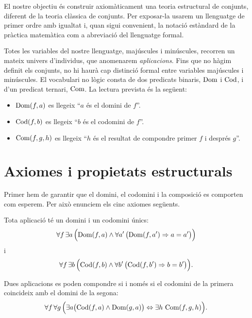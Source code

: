 El nostre objectiu és construir axiomàticament una teoria estructural de conjunts, diferent de la teoria clàssica de conjunts. Per exposar-la usarem un llenguatge de primer ordre amb igualtat i, quan sigui convenient, la notació estàndard de la pràctica matemàtica com a abreviació del llenguatge formal.

Totes les variables del nostre llenguatge, majúscules i minúscules, recorren un mateix univers d'individus, que anomenarem \emph{aplicacions}. Fins que no hàgim definit els conjunts, no hi haurà cap distinció formal entre variables majúscules i minúscules. El vocabulari no lògic consta de dos predicats binaris, \(\operatorname{Dom}\) i \(\operatorname{Cod}\), i d'un predicat ternari, \(\operatorname{Com}\). La lectura prevista és la següent:
\begin{itemize}
  \item \(\operatorname{Dom}(f,a)\) es llegeix \enquote{\(a\) és el domini de \(f\)}.
  \item \(\operatorname{Cod}(f,b)\) es llegeix \enquote{\(b\) és el codomini de \(f\)}.
  \item \(\operatorname{Com}(f,g,h)\) es llegeix \enquote{\(h\) és el resultat de compondre primer \(f\) i després \(g\)}.
\end{itemize}

\section{Axiomes i propietats estructurals}\label{sec:axiomes-estructurals}

Primer hem de garantir que el domini, el codomini i la composició es comporten com esperem. Per això enunciem els cinc axiomes següents. 

\begin{axioma}\label{ax:dom-cod}
Tota aplicació té un domini i un codomini únics:
\[
\forall f\,\exists a\,\Bigl(\operatorname{Dom}(f,a)\land
  \forall a' \,\bigl(\operatorname{Dom}(f,a')\Rightarrow a=a'\bigr)\Bigr)
\]
i
\[
\forall f\,\exists b\,\Bigl(\operatorname{Cod}(f,b)\land
  \forall b'\,\bigl(\operatorname{Cod}(f,b')\Rightarrow b=b'\bigr)\Bigr).
\]
\end{axioma}

\begin{axioma}\label{ax:composicio-existencia}
Dues aplicacions es poden compondre si i només si el codomini de la primera coincideix amb el domini de la segona:
\[
\forall f\,\forall g\,
\Bigl(
  \exists a\bigl(\operatorname{Cod}(f,a)\land\operatorname{Dom}(g,a)\bigr)
  \Leftrightarrow
  \exists h\,\operatorname{Com}(f,g,h)
\Bigr).
\]
\end{axioma}

